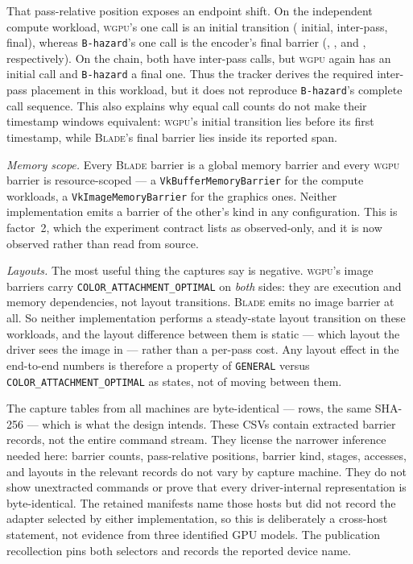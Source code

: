 \documentclass[10pt,twocolumn]{article}
\newcommand{\blade}{\textsc{Blade}}
\newcommand{\wgpu}{\textsc{wgpu}}
\begin{document}
That pass-relative position exposes an endpoint shift. On the independent
compute workload, \wgpu's one call is an initial transition
( initial,
 inter-pass,
 final), whereas
\texttt{B-hazard}'s one call is the encoder's final barrier
(,
, and
, respectively). On the chain,
both have  inter-pass calls, but
\wgpu{} again has an initial call and \texttt{B-hazard} a final one. Thus the
tracker derives the required inter-pass placement in this workload, but it
does not reproduce \texttt{B-hazard}'s complete call sequence. This also
explains why equal call counts do not make their timestamp windows equivalent:
\wgpu's initial transition lies before its first timestamp, while \blade's
final barrier lies inside its reported span.

\emph{Memory scope.} Every \blade{} barrier is a global memory barrier and
every \wgpu{} barrier is resource-scoped --- a \texttt{VkBufferMemoryBarrier}
for the compute workloads, a \texttt{VkImageMemoryBarrier} for the graphics
ones. Neither implementation emits a barrier of the other's kind in any
configuration. This is factor~2, which the experiment contract lists as
observed-only, and it is now observed rather than read from source.

\emph{Layouts.} The most useful thing the captures say is negative. \wgpu's
image barriers carry \texttt{COLOR\_ATTACHMENT\_OPTIMAL} on \emph{both} sides:
they are execution and memory dependencies, not layout transitions. \blade{}
emits no image barrier at all. So neither implementation performs a
steady-state layout transition on these workloads, and the layout difference
between them is static --- which layout the driver sees the image in --- rather
than a per-pass cost. Any layout effect in the end-to-end numbers is therefore
a property of \texttt{GENERAL} versus \texttt{COLOR\_ATTACHMENT\_OPTIMAL} as
states, not of moving between them.

The capture tables from all  machines are
byte-identical ---  rows, the same SHA-256 --- which is
what the design intends. These CSVs contain extracted barrier records, not the
entire command stream. They license the narrower inference needed here:
barrier counts, pass-relative positions, barrier kind, stages, accesses, and
layouts in the relevant records do not vary by capture machine. They do not
show unextracted commands or prove that every driver-internal representation
is byte-identical. The retained manifests name those hosts but did not record
the adapter selected by either implementation, so this is deliberately a
cross-host statement, not evidence from three identified GPU models. The
publication recollection pins both selectors and records the reported device
name.
\end{document}
